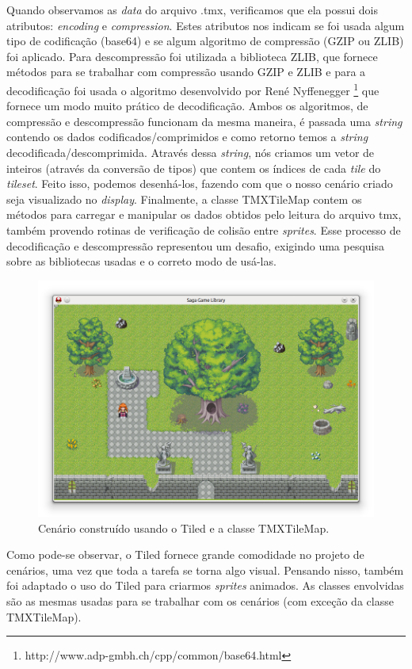 %
\par 
Quando observamos as \textit{data} do arquivo .tmx, verificamos que ela possui dois atributos: \textit{encoding} e \textit{compression}. Estes atributos nos indicam se foi usada algum tipo de codificação (base64) e se algum algoritmo de compressão (GZIP ou ZLIB) foi aplicado. Para descompressão foi utilizada a biblioteca ZLIB, que fornece métodos para se trabalhar com compressão usando GZIP e ZLIB e para a decodificação foi usada o algoritmo desenvolvido por René Nyffenegger \footnote{http://www.adp-gmbh.ch/cpp/common/base64.html} que fornece um modo muito prático de decodificação. Ambos os algoritmos, de compressão e descompressão funcionam da mesma maneira, é passada uma \textit{string} contendo os dados codificados/comprimidos e como retorno temos a \textit{string} decodificada/descomprimida. 
Através dessa \textit{string}, nós criamos um vetor de inteiros (através da conversão de tipos) que contem os índices
de cada \textit{tile} do \textit{tileset}. Feito isso, podemos desenhá-los, fazendo com que o nosso cenário criado seja visualizado no \textit{display}. Finalmente, a classe TMXTileMap contem os métodos para carregar e manipular os dados obtidos pelo leitura do arquivo tmx, também provendo rotinas de verificação de colisão entre \textit{sprites}. Esse processo de decodificação e descompressão representou um desafio, exigindo uma pesquisa sobre as bibliotecas usadas e o correto modo de usá-las.
%
%
\begin{figure}[ht]
    \centering
    \includegraphics[scale = 0.60]{Imagens/snapshot1.png}
    \caption{Cenário construído usando o Tiled e a classe TMXTileMap.}
    \label{snapshot1}
\end{figure}
%
\par 
Como pode-se observar, o Tiled fornece grande comodidade no projeto de cenários, uma vez que toda a tarefa se torna algo visual. Pensando nisso, também foi adaptado o uso do Tiled para criarmos \textit{sprites} animados. As classes envolvidas são as mesmas usadas para se trabalhar com os cenários (com exceção da classe TMXTileMap).
%
%
